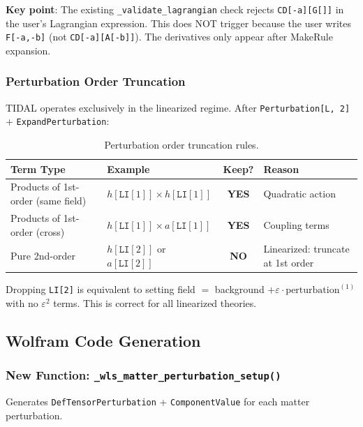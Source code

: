 \textbf{Key point}: The existing \texttt{\_validate\_lagrangian} check rejects \texttt{CD[-a][G[]]} in the user's Lagrangian expression. This does NOT trigger because the user writes \texttt{F[-a,-b]} (not \texttt{CD[-a][A[-b]]}). The derivatives only appear after MakeRule expansion.

\subsubsection{Perturbation Order Truncation}
\label{sec:mfp-truncation}

TIDAL operates exclusively in the linearized regime. After \texttt{Perturbation[L, 2]} + \texttt{ExpandPerturbation}:

\begin{table}[htbp]
\centering
\caption{Perturbation order truncation rules.}
\label{tab:mfp-truncation}
\begin{tabular}{@{}llcl@{}}
\toprule
Term Type & Example & Keep? & Reason \\
\midrule
Products of 1st-order (same field) & $h[\texttt{LI}[1]] \times h[\texttt{LI}[1]]$ & \textbf{YES} & Quadratic action \\
Products of 1st-order (cross) & $h[\texttt{LI}[1]] \times a[\texttt{LI}[1]]$ & \textbf{YES} & Coupling terms \\
Pure 2nd-order & $h[\texttt{LI}[2]]$ or $a[\texttt{LI}[2]]$ & \textbf{NO} & Linearized: truncate at 1st order \\
\bottomrule
\end{tabular}
\end{table}

Dropping \texttt{LI[2]} is equivalent to setting field $=$ background $+ \varepsilon \cdot \text{perturbation}^{(1)}$ with no $\varepsilon^2$ terms. This is correct for all linearized theories.

\subsection{Wolfram Code Generation}
\label{sec:mfp-wolfram}

\subsubsection{New Function: \texttt{\_wls\_matter\_perturbation\_setup()}}
\label{sec:mfp-wls-setup}

Generates \texttt{DefTensorPerturbation} + \texttt{ComponentValue} for each matter perturbation.


